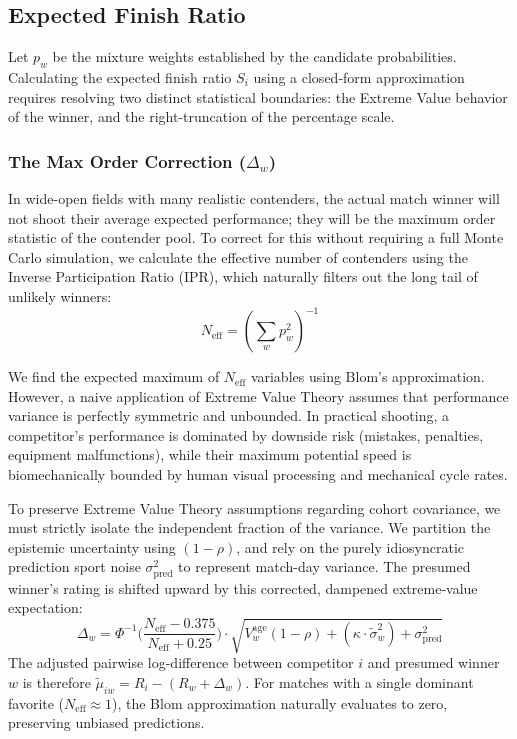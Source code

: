 \documentclass[12pt]{article}
\begin{document}
	\subsection{Expected Finish Ratio}
	Let $p_w$ be the mixture weights established by the candidate probabilities. Calculating the expected finish ratio $S_i$ using a closed-form approximation requires resolving two distinct statistical boundaries: the Extreme Value behavior of the winner, and the right-truncation of the percentage scale.

	\subsubsection*{The Max Order Correction ($\Delta_w$)}
	In wide-open fields with many realistic contenders, the actual match winner will not shoot their average expected performance; they will be the maximum order statistic of the contender pool. To correct for this without requiring a full Monte Carlo simulation, we calculate the effective number of contenders using the Inverse Participation Ratio (IPR), which naturally filters out the long tail of unlikely winners:
	\begin{equation}
		N_{\mathrm{eff}} = \left(\sum_w p_w^2\right)^{-1}
	\end{equation}

	We find the expected maximum of $N_{\mathrm{eff}}$ variables using Blom's approximation. However, a naive application of Extreme Value Theory assumes that performance variance is perfectly symmetric and unbounded. In practical shooting, a competitor's performance is dominated by downside risk (mistakes, penalties, equipment malfunctions), while their maximum potential speed is biomechanically bounded by human visual processing and mechanical cycle rates.

	To preserve Extreme Value Theory assumptions regarding cohort covariance, we must strictly isolate the independent fraction of the variance. We partition the epistemic uncertainty using $(1 - \rho)$, and rely on the purely idiosyncratic prediction sport noise $\sigma_{\mathrm{pred}}^2$ to represent match-day variance. The presumed winner's rating is shifted upward by this corrected, dampened extreme-value expectation:
	\begin{equation}
		\Delta_w = \Phi^{-1}\Big(\frac{N_\mathrm{eff} - 0.375}{N_\mathrm{eff} + 0.25}\Big) \cdot \sqrt{V_w^{\mathrm{age}}(1 - \rho) + (\kappa \cdot \tilde{\sigma}_w^2) + \sigma_{\mathrm{pred}}^2}
	\end{equation}
	The adjusted pairwise log-difference between competitor $i$ and presumed winner $w$ is therefore $\tilde{\mu}_{iw} = R_i - (R_w + \Delta_w)$. For matches with a single dominant favorite ($N_{\mathrm{eff}} \approx 1$), the Blom approximation naturally evaluates to zero, preserving unbiased predictions.
\end{document}
